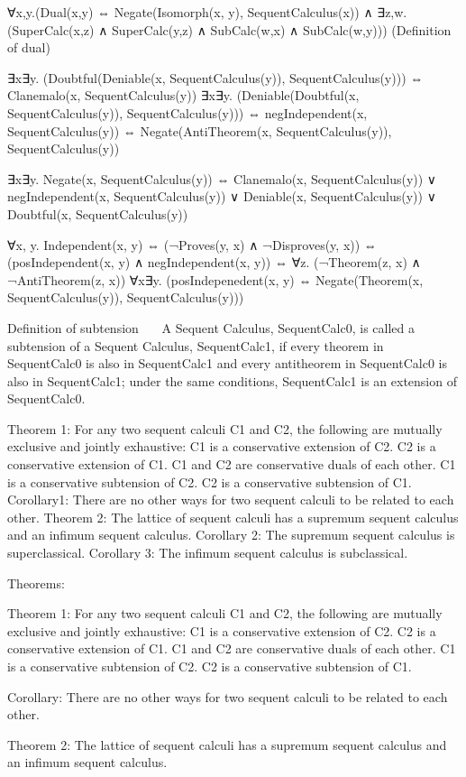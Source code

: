 \documentclass{article}
\begin{document}
∀x,y.(Dual(x,y) ⇔ Negate(Isomorph(x, y), SequentCalculus(x)) ∧ ∃z,w.(SuperCalc(x,z) ∧ SuperCalc(y,z) ∧ SubCalc(w,x) ∧ SubCalc(w,y))) (Definition of dual)

∃x∃y. (Doubtful(Deniable(x, SequentCalculus(y)), SequentCalculus(y))) ⇔ Clanemalo(x, SequentCalculus(y))
∃x∃y. (Deniable(Doubtful(x, SequentCalculus(y)), SequentCalculus(y))) ⇔ negIndependent(x, SequentCalculus(y)) ⇔ Negate(AntiTheorem(x, SequentCalculus(y)), SequentCalculus(y))

∃x∃y. Negate(x, SequentCalculus(y)) ⇔ Clanemalo(x, SequentCalculus(y)) ∨ negIndependent(x, SequentCalculus(y)) ∨ Deniable(x, SequentCalculus(y)) ∨ Doubtful(x, SequentCalculus(y))

∀x, y. Independent(x, y) ⇔ (¬Proves(y, x) ∧ ¬Disproves(y, x)) ⇔ (posIndependent(x, y) ∧ negIndependent(x, y)) ⇔ ∀z. (¬Theorem(z, x) ∧ ¬AntiTheorem(z, x))
∀x∃y. (posIndepenedent(x, y) ⇔ Negate(Theorem(x, SequentCalculus(y)), SequentCalculus(y)))

   Definition of subtension   
A Sequent Calculus, SequentCalc0, is called a subtension of a Sequent Calculus, SequentCalc1, if every theorem in SequentCalc0 is also in SequentCalc1 and every antitheorem in SequentCalc0 is also in SequentCalc1; under the same conditions, SequentCalc1 is an extension of SequentCalc0.

Theorem 1: For any two sequent calculi C1 and C2, the following are mutually exclusive and jointly exhaustive:
C1 is a conservative extension of C2.
C2 is a conservative extension of C1.
C1 and C2 are conservative duals of each other.
C1 is a conservative subtension of C2.
C2 is a conservative subtension of C1.
Corollary1: There are no other ways for two sequent calculi to be related to each other.
Theorem 2: The lattice of sequent calculi has a supremum sequent calculus and an infimum sequent calculus.
Corollary 2: The supremum sequent calculus is superclassical.
Corollary 3: The infimum sequent calculus is subclassical.

Theorems:

Theorem 1: For any two sequent calculi C1 and C2, the following are mutually exclusive and jointly exhaustive:
C1 is a conservative extension of C2.
C2 is a conservative extension of C1.
C1 and C2 are conservative duals of each other.
C1 is a conservative subtension of C2.
C2 is a conservative subtension of C1.

Corollary: There are no other ways for two sequent calculi to be related to each other.

Theorem 2: The lattice of sequent calculi has a supremum sequent calculus and an infimum sequent calculus.
\end{document}
